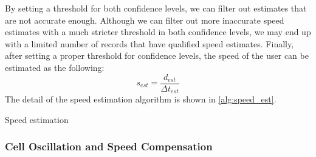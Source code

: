 By setting a threshold for both confidence levels, we can filter out estimates that are not accurate enough. Although we can filter out more inaccurate speed estimates with a much stricter threshold in both confidence levels, we may end up with a limited number of records that have qualified speed estimates. Finally, after setting a proper threshold for confidence levels, the speed of the user can be estimated as the following:
\begin{equation}
  s_{est} = \frac{d_{est}}{\Delta t_{est}}
\end{equation}
The detail of the speed estimation algorithm is shown in \autoref{alg:speed_est}.


\begin{algorithm}
 \caption{Speed estimation}\label{alg:speed_est}
\end{algorithm}


\subsubsection{Cell Oscillation and Speed Compensation}\label{sec:Oscillation}

